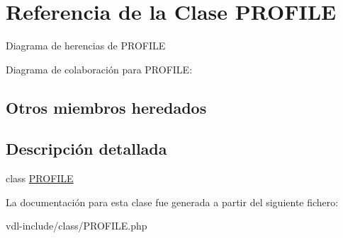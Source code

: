 \hypertarget{class_p_r_o_f_i_l_e}{\section{Referencia de la Clase P\-R\-O\-F\-I\-L\-E}
\label{class_p_r_o_f_i_l_e}
}


Diagrama de herencias de P\-R\-O\-F\-I\-L\-E


Diagrama de colaboración para P\-R\-O\-F\-I\-L\-E\-:
\subsection*{Otros miembros heredados}


\subsection{Descripción detallada}
class \hyperlink{class_p_r_o_f_i_l_e}{P\-R\-O\-F\-I\-L\-E} 

La documentación para esta clase fue generada a partir del siguiente fichero\-:\begin{DoxyCompactItemize}
\item 
vdl-\/include/class/P\-R\-O\-F\-I\-L\-E.\-php\end{DoxyCompactItemize}
